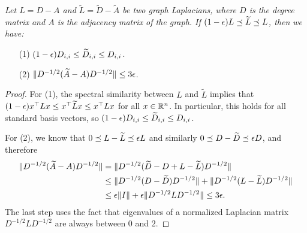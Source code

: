 {\enspace \em
Let $L = D - A$ and $\tilde L = \tilde{D} - \tilde{A}$ be two graph Laplacians, where $D$ is the degree matrix and $A$ is the adjacency matrix of the graph.
If $(1-\epsilon) L \preceq \widetilde L \preceq L$, then we have:
\begin{enumerate}
\item[(1)] $(1-\epsilon) D_{i,i} \le \widetilde{D}_{i,i} \le D_{i,i}$.
\item[(2)] $\lVert D^{-1/2}(\widetilde{A} - A)D^{-1/2}{\rVert} \le 3\epsilon$.
\end{enumerate}
}
\begin{proof}
For (1), the spectral similarity between $L$ and $\tilde L$ implies that $(1-\epsilon) x^\top L x \le x^\top \widetilde{L} x \le x^\top L x$ for all $x \in \mathbb{R}^n$.
In particular, this holds for all standard basis vectors, so $(1-\epsilon) D_{i,i} \le \widetilde{D}_{i,i} \le D_{i,i}$.

For (2), we know that $0 \preceq L - \widetilde{L} \preceq \epsilon L$ and similarly $0 \preceq D-\widetilde{D} \preceq \epsilon D$, and therefore
\begin{align*}
\norm{D^{-1/2}(\tilde{A} - A)D^{-1/2}}
& = \norm{D^{-1/2}(\tilde{D} - D + L - \tilde{L})D^{-1/2}} \\
& \le \norm{D^{-1/2} (D - \tilde D) D^{-1/2}} + \norm{D^{-1/2} (L - \tilde L) D^{-1/2}} \\
& \le \eps \norm{I} + \eps \norm{D^{-1/2} L D^{-1/2}} \le 3\eps. %
\end{align*}
The last step uses the fact that eigenvalues of a normalized Laplacian matrix $D^{-1/2} L D^{-1/2}$ are always between $0$ and $2$.
\end{proof}